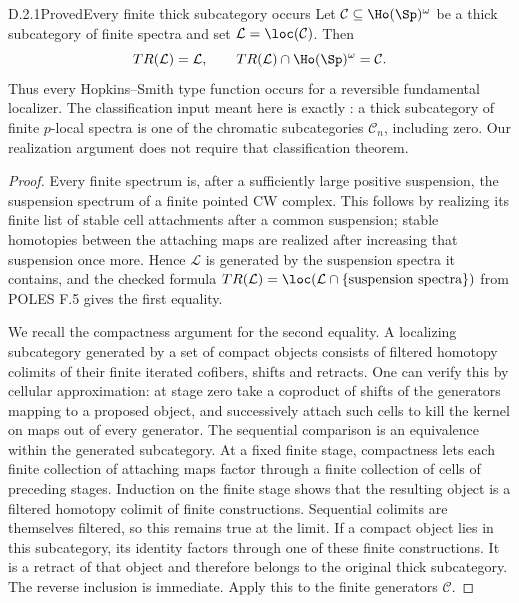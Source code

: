 


\begin{claim}{D.2.1}{Proved}{Every finite thick subcategory occurs}
Let $\mathcal C\subseteq\Ho(\Sp)^\omega$ be a thick subcategory of finite spectra and set $\mathcal L=\loc(\mathcal C)$. Then
\[
 T R(\mathcal L)=\mathcal L,
 \qquad T R(\mathcal L)\cap\Ho(\Sp)^\omega=\mathcal C.
\]
Thus every Hopkins--Smith type function occurs for a reversible fundamental localizer. The classification input meant here is exactly \citet[Theorem 7]{HopkinsSmith1998}: a thick subcategory of finite $p$-local spectra is one of the chromatic subcategories $\mathcal C_n$, including zero. Our realization argument does not require that classification theorem.
\end{claim}
\begin{proof}
Every finite spectrum is, after a sufficiently large positive suspension, the suspension spectrum of a finite pointed CW complex. This follows by realizing its finite list of stable cell attachments after a common suspension; stable homotopies between the attaching maps are realized after increasing that suspension once more. Hence $\mathcal L$ is generated by the suspension spectra it contains, and the checked formula $TR(\mathcal L)=\loc(\mathcal L\cap\{\text{suspension spectra}\})$ from POLES F.5 gives the first equality.

We recall the compactness argument for the second equality. A localizing subcategory generated by a set of compact objects consists of filtered homotopy colimits of their finite iterated cofibers, shifts and retracts. One can verify this by cellular approximation: at stage zero take a coproduct of shifts of the generators mapping to a proposed object, and successively attach such cells to kill the kernel on maps out of every generator. The sequential comparison is an equivalence within the generated subcategory. At a fixed finite stage, compactness lets each finite collection of attaching maps factor through a finite collection of cells of preceding stages. Induction on the finite stage shows that the resulting object is a filtered homotopy colimit of finite constructions. Sequential colimits are themselves filtered, so this remains true at the limit. If a compact object lies in this subcategory, its identity factors through one of these finite constructions. It is a retract of that object and therefore belongs to the original thick subcategory. The reverse inclusion is immediate. Apply this to the finite generators $\mathcal C$.
\end{proof}

